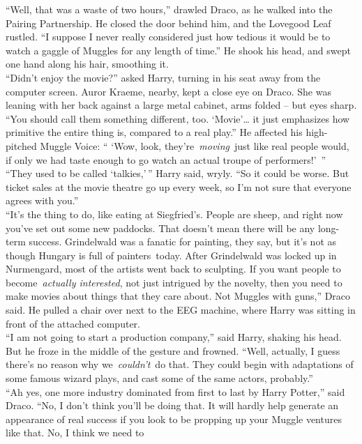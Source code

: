 ``Well, that was a waste of two hours,'' drawled Draco, as he walked
into the Pairing Partnership. He closed the door behind him, and the
Lovegood Leaf rustled. ``I suppose I never really considered just how
tedious it would be to watch a gaggle of Muggles for any length of
time.'' He shook his head, and swept one hand along his hair, smoothing
it. \\
``Didn't enjoy the movie?'' asked Harry, turning in his seat away from
the computer screen. Auror Kraeme, nearby, kept a close eye on Draco.
She was leaning with her back against a large metal cabinet, arms folded
-- but eyes sharp. \\
``You should call them something different, too. `Movie'\ldots{} it just
emphasizes how primitive the entire thing is, compared to a real play.''
He affected his high-pitched Muggle Voice: `` `Wow, look,
they're~\emph{moving}~just like real people would, if only we had taste
enough to go watch an actual troupe of performers!'~'' \\
``They used to be called `talkies,'\,'' Harry said, wryly. ``So it could
be worse. But ticket sales at the movie theatre go up every week, so I'm
not sure that everyone agrees with you.'' \\
``It's the thing to do, like eating at Siegfried's. People are sheep,
and right now you've set out some new paddocks. That doesn't mean there
will be any long-term success. Grindelwald was a fanatic for painting,
they say, but it's not as though Hungary is full of painters~today.
After Grindelwald was locked up in Nurmengard, most of the artists went
back to sculpting. If you want people to become~\emph{actually
interested}, not just intrigued by the novelty, then you need to make
movies about things that they care about. Not Muggles with guns,'' Draco
said. He pulled a chair over next to the EEG machine, where Harry was
sitting in front of the attached computer. \\
``I am not going to start a production company,'' said Harry, shaking
his head. But he froze in the middle of the gesture and frowned. ``Well,
actually, I guess there's no reason why we~\emph{couldn't}~do that. They
could begin with adaptations of some famous wizard plays, and cast some
of the same actors, probably.'' \\
``Ah yes, one more industry dominated from first to last by Harry
Potter,'' said Draco. ``No, I don't think you'll be doing that. It will
hardly help generate an appearance of real success if you look to be
propping up your Muggle ventures like that. No, I think we need to
